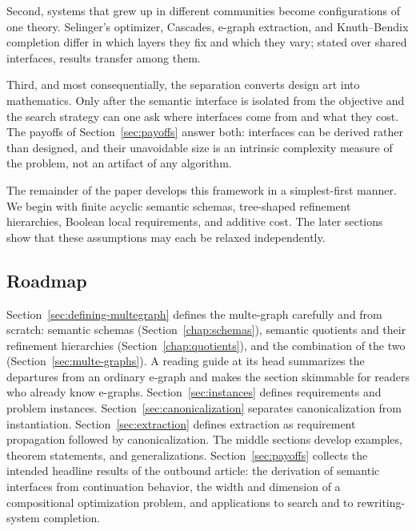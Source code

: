 \documentclass[sigconf,nonacm]{acmart}
\theoremstyle{definition}
\theoremstyle{plain}
\theoremstyle{remark}
\begin{document}
Second, systems that grew up in different communities become
configurations of one theory.  Selinger's optimizer, Cascades,
e-graph extraction, and Knuth--Bendix completion differ in which
layers they fix and which they vary; stated over shared interfaces,
results transfer among them.

Third, and most consequentially, the separation converts design art
into mathematics.  Only after the semantic interface is isolated
from the objective and the search strategy can one ask where
interfaces come from and what they cost.  The payoffs of
Section~\ref{sec:payoffs} answer both: interfaces can be derived
rather than designed, and their unavoidable size is an intrinsic
complexity measure of the problem, not an artifact of any
algorithm.

The remainder of the paper develops this framework in a
simplest-first manner.
We begin with finite acyclic semantic schemas, tree-shaped refinement
hierarchies, Boolean local requirements, and additive cost.
The later sections show that these assumptions may each be relaxed
independently.

\subsection{Roadmap}
\label{sec:intro-roadmap}

Section~\ref{sec:defining-multegraph} defines the multe-graph
carefully and from scratch: semantic schemas
(Section~\ref{chap:schemas}), semantic quotients and their
refinement hierarchies (Section~\ref{chap:quotients}), and the
combination of the two (Section~\ref{sec:multe-graphs}).  A reading
guide at its head summarizes the departures from an ordinary e-graph
and makes the section skimmable for readers who already know
e-graphs.
Section~\ref{sec:instances} defines requirements and problem
instances.
Section~\ref{sec:canonicalization} separates canonicalization
from instantiation.
Section~\ref{sec:extraction} defines extraction as requirement
propagation followed by canonicalization.
The middle sections develop examples, theorem statements, and
generalizations.
Section~\ref{sec:payoffs} collects the intended headline results of
the outbound article: the derivation of semantic interfaces from
continuation behavior, the width and dimension of a compositional
optimization problem, and applications to search and to
rewriting-system completion.
\end{document}
